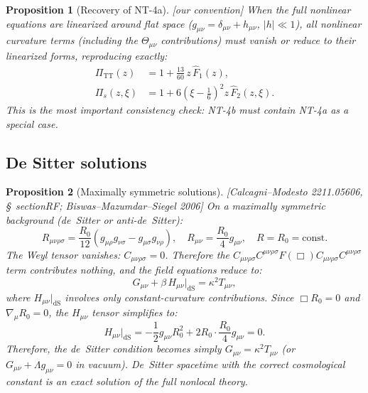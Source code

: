 \documentclass[12pt,a4paper]{article}
\newtheorem{proposition}{Proposition}[section]
\theoremstyle{definition}
\theoremstyle{remark}
\newcommand{\Weylsq}{C_{\mu\nu\rho\sigma}C^{\mu\nu\rho\sigma}}
\newcommand{\fromlit}[1]{\textcolor{blue!70!black}{\textsf{[#1]}}}
\newcommand{\oursign}{\textcolor{teal!80!black}{\textsf{[our convention]}}}
\begin{document}
\begin{proposition}[Recovery of NT-4a]
\label{prop:linearized-limit}
\oursign\;
When the full nonlinear equations are linearized around flat space
($g_{\mu\nu} = \delta_{\mu\nu} + h_{\mu\nu}$, $|h| \ll 1$), all
nonlinear curvature terms (including the $\Theta_{\mu\nu}$ contributions)
must vanish or reduce to their linearized forms, reproducing exactly:
\begin{align}
  \Pi_{\mathrm{TT}}(z) &= 1 + \frac{13}{60}\,z\,\hat{F}_1(z),\\
  \Pi_s(z,\xi) &= 1 + 6\left(\xi-\frac{1}{6}\right)^2 z\,\hat{F}_2(z,\xi).
\end{align}
This is the most important consistency check: NT-4b must contain
NT-4a as a special case.
\end{proposition}


\subsection{De Sitter solutions}

\begin{proposition}[Maximally symmetric solutions]
\label{prop:deSitter}
\fromlit{Calcagni--Modesto 2211.05606, \S~sectionRF;
Biswas--Mazumdar--Siegel 2006}
On a maximally symmetric background (de~Sitter or anti-de~Sitter):
\begin{equation}
  R_{\mu\nu\rho\sigma} = \frac{R_0}{12}
    (g_{\mu\rho}g_{\nu\sigma} - g_{\mu\sigma}g_{\nu\rho}),
  \quad
  R_{\mu\nu} = \frac{R_0}{4}g_{\mu\nu},
  \quad
  R = R_0 = \text{const}.
\end{equation}
The Weyl tensor vanishes: $C_{\mu\nu\rho\sigma} = 0$.  Therefore the
$\Weylsq F(\Box)\Weylsq$ term contributes nothing, and the field
equations reduce to:
\begin{equation}
  G_{\mu\nu} + \beta\,H_{\mu\nu}\big|_{\text{dS}}
  = \kappa^2 T_{\mu\nu},
\end{equation}
where $H_{\mu\nu}|_{\text{dS}}$ involves only constant-curvature
contributions.  Since $\Box R_0 = 0$ and $\nabla_\mu R_0 = 0$, the
$H_{\mu\nu}$ tensor simplifies to:
\begin{equation}
  H_{\mu\nu}\big|_{\text{dS}}
  = -\frac{1}{2}g_{\mu\nu}R_0^2 + 2R_0\cdot\frac{R_0}{4}g_{\mu\nu}
  = 0.
\end{equation}
Therefore, the de~Sitter condition becomes simply
$G_{\mu\nu} = \kappa^2 T_{\mu\nu}$ (or $G_{\mu\nu} + \Lambda g_{\mu\nu} = 0$
in vacuum).  De~Sitter spacetime with the correct cosmological constant
is an exact solution of the full nonlocal theory.
\end{proposition}
\end{document}
